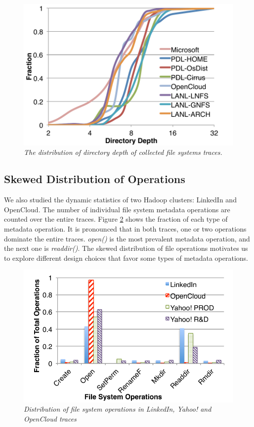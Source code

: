 \begin{figure}[!ht]
\center
\includegraphics[scale=0.4]{figs/directory_depth}
\caption{\textit{The distribution of directory depth of
collected file systems traces.}}
\label{fig:directory_depth}
\end{figure}

\subsection{Skewed Distribution of Operations}

We also studied the dynamic statistics of two Hadoop clusters:
LinkedIn and OpenCloud. The number of individual file system
metadata operations are counted over the entire traces.
Figure \ref{fig:operation} shows the fraction of each type
of metadata operation. It is pronounced that in both traces,
one or two operations dominate the entire traces.
\textit{open()} is the most prevalent metadata operation,
and the next one is \textit{readdir()}.
The skewed distribution of file operations motivates us to
explore different design choices that favor some types
of metadata operations.

\begin{figure}[!ht]
\center
\includegraphics[scale=0.5]{figs/operation_distribution}
\caption{\textit{Distribution of file system operations in
LinkedIn, Yahoo! and OpenCloud traces}}
\label{fig:operation}
\end{figure}
